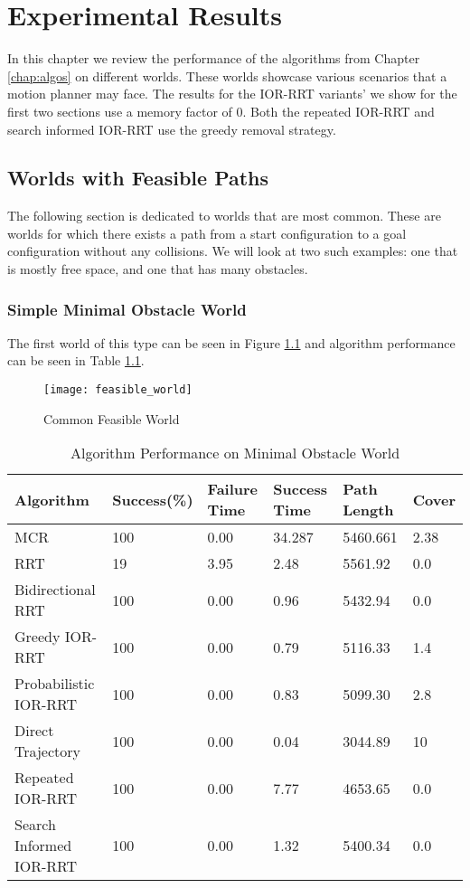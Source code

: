 \chapter{Experimental Results}
In this chapter we review the performance of the algorithms from Chapter \ref{chap:algos} on different worlds. These worlds showcase various scenarios that a motion planner may face. The results for the IOR-RRT variants' we show for the first two sections use a memory factor of 0. Both the repeated IOR-RRT and search informed IOR-RRT use the greedy removal strategy. 

\section{Worlds with Feasible Paths}\label{results:feasible}
The following section is dedicated to worlds that are most common. These are worlds for which there exists a path from a start configuration to a goal configuration without any collisions. We will look at two such examples: one that is mostly free space, and one that has many obstacles.

\subsection{Simple Minimal Obstacle World}
The first world of this type can be seen in Figure \ref{fig:feasible_world} and algorithm performance can be seen in Table \ref{tab:feasible_world}. 

\begin{figure}[h!]
    \centering
    \texttt{[image: feasible\_world]}
    \caption{Common Feasible World}
    \label{fig:feasible_world}
\end{figure}

\begin{table}[h!]
\centering
\begin{tabular}{@{}llllll@{}}
\toprule
Algorithm & Success(\%)  & Failure Time  & Success Time  & Path Length & Cover\\ 
\midrule
MCR & 100 & 0.00 & 34.287 & 5460.661 & 2.38 \\
RRT & 19 & 3.95 & 2.48 & 5561.92 & 0.0 \\ 
Bidirectional RRT & 100 & 0.00 & 0.96 & 5432.94 & 0.0 \\
Greedy IOR-RRT & 100 & 0.00 & 0.79 & 5116.33 & 1.4 \\
Probabilistic IOR-RRT & 100 & 0.00 & 0.83 & 5099.30 & 2.8 \\
Direct Trajectory & 100 & 0.00 & 0.04 & 3044.89 & 10 \\
Repeated IOR-RRT & 100 & 0.00 & 7.77 & 4653.65 & 0.0 \\
Search Informed IOR-RRT & 100 & 0.00 & 1.32 & 5400.34 & 0.0 \\
\bottomrule
\end{tabular}
\caption{Algorithm Performance on Minimal Obstacle World}
\label{tab:feasible_world}
\end{table}


